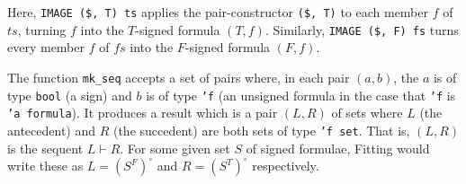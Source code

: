 \documentclass[a4paper]{article}
\newcommand{\hol}{\texttt{HOL4}}
\begin{document}

Here,
\texttt{IMAGE (\$, T) ts}
applies the pair-constructor
\texttt{(\$, T)} to each member $f$ of $ts$,
turning $f$ into the $T$-signed formula $(T, f)$. Similarly,
\texttt{IMAGE (\$, F) fs} turns every member $f$ of $fs$ 
into the $F$-signed formula $(F, f)$.

The function \texttt{mk\_seq} accepts a set of pairs where, in each
pair $(a,b)$, the $a$ is of type \texttt{bool} (a sign) and $b$ is of
type \texttt{'f} (an unsigned formula in the case that \texttt{'f} is
\texttt{'a formula}). It produces a result which is a pair $(L,R)$ of
sets where $L$ (the antecedent) and $R$ (the succedent) 
are both sets of type \texttt{'f set}. That is,
$(L, R)$ is the sequent $L \vdash R$. For some given set $S$ of signed
formulae, Fitting would write these as 
$L = (S^F)^\circ$
and 
$R = (S^T)^\circ$ 
respectively.





\end{document}
